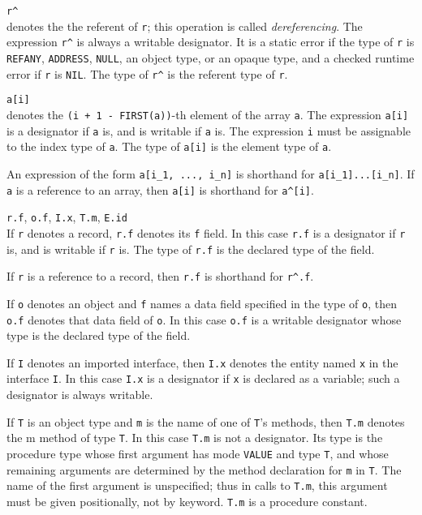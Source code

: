 \documentclass[10pt]{article}
\begin{document}
\begin{description}
\item \verb|r^| \\
  denotes the the referent of \verb|r|; this operation is called
  \emph{dereferencing}.  The expression \verb|r^| is always a writable
  designator.  It is a static error if the type of \verb|r| is \verb|REFANY|,
  \verb|ADDRESS|, \verb|NULL|, an object type, or an opaque type, and a
  checked runtime error if \verb|r| is \verb|NIL|.  The type of \verb|r^| is
  the referent type of \verb|r|.
\item \verb|a[i]| \\
  denotes the \verb|(i + 1 - FIRST(a))|-th element of the array \verb|a|.  The
  expression \verb|a[i]| is a designator if \verb|a| is, and is writable if
  \verb|a| is.  The expression \verb|i| must be assignable to the index type
  of \verb|a|.  The type of \verb|a[i]| is the element type of \verb|a|.

  An expression of the form \verb|a[i_1, ..., i_n]| is shorthand for
  \verb|a[i_1]...[i_n]|.  If \verb|a| is a reference to an array, then
  \verb|a[i]| is shorthand for \verb|a^[i]|.
\item \verb|r.f|, \verb|o.f|, \verb|I.x|, \verb|T.m|, \verb|E.id| \\
  If \verb|r| denotes a record, \verb|r.f| denotes its \verb|f| field.  In
  this case \verb|r.f| is a designator if \verb|r| is, and is writable if
  \verb|r| is.  The type of \verb|r.f| is the declared type of the field.

  If \verb|r| is a reference to a record, then \verb|r.f| is shorthand for
  \verb|r^.f|.

  If \verb|o| denotes an object and \verb|f| names a data field specified in
  the type of \verb|o|, then \verb|o.f| denotes that data field of \verb|o|.
  In this case \verb|o.f| is a writable designator whose type is the declared
  type of the field.

  If \verb|I| denotes an imported interface, then \verb|I.x| denotes the
  entity named \verb|x| in the interface \verb|I|.  In this case \verb|I.x| is
  a designator if \verb|x| is declared as a variable; such a designator is
  always writable.

  If \verb|T| is an object type and \verb|m| is the name of one of \verb|T|'s
  methods, then \verb|T.m| denotes the m method of type \verb|T|.  In this
  case \verb|T.m| is not a designator.  Its type is the procedure type whose
  first argument has mode \verb|VALUE| and type \verb|T|, and whose remaining
  arguments are determined by the method declaration for \verb|m| in \verb|T|.
  The name of the first argument is unspecified; thus in calls to \verb|T.m|,
  this argument must be given positionally, not by keyword.  \verb|T.m| is a
  procedure constant.


\end{description}
\end{document}
